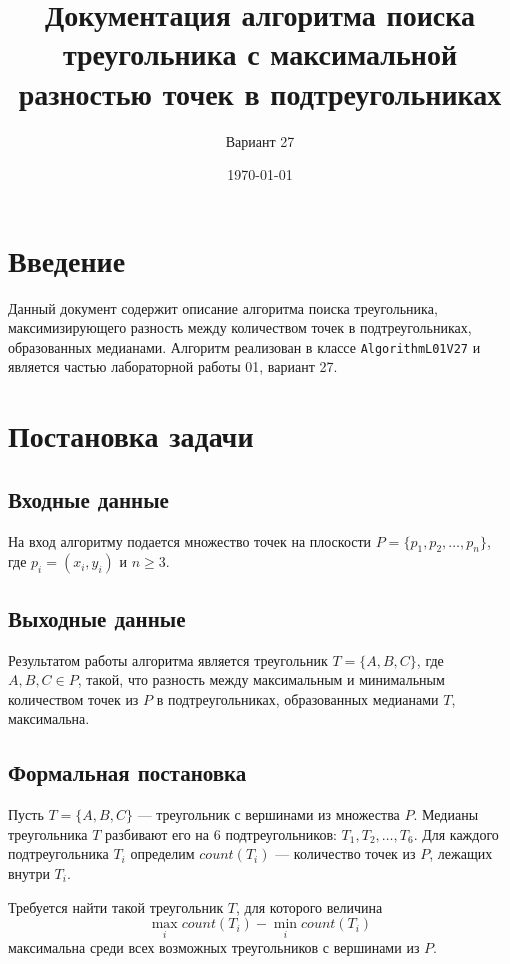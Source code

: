 \documentclass[a4paper,12pt]{article}
\title{Документация алгоритма поиска треугольника с максимальной разностью точек в подтреугольниках}
\author{Вариант 27}
\date{\today}
\begin{document}
\maketitle

\tableofcontents

\newpage

\section{Введение}

Данный документ содержит описание алгоритма поиска треугольника, максимизирующего разность между количеством точек в подтреугольниках, образованных медианами. Алгоритм реализован в классе \texttt{AlgorithmL01V27} и является частью лабораторной работы 01, вариант 27.

\section{Постановка задачи}

\subsection{Входные данные}
На вход алгоритму подается множество точек на плоскости $P = \{p_1, p_2, \ldots, p_n\}$, где $p_i = (x_i, y_i)$ и $n \geq 3$.

\subsection{Выходные данные}
Результатом работы алгоритма является треугольник $T = \{A, B, C\}$, где $A, B, C \in P$, такой, что разность между максимальным и минимальным количеством точек из $P$ в подтреугольниках, образованных медианами $T$, максимальна.

\subsection{Формальная постановка}
Пусть $T = \{A, B, C\}$ — треугольник с вершинами из множества $P$. Медианы треугольника $T$ разбивают его на 6 подтреугольников: $T_1, T_2, \ldots, T_6$. Для каждого подтреугольника $T_i$ определим $count(T_i)$ — количество точек из $P$, лежащих внутри $T_i$.

Требуется найти такой треугольник $T$, для которого величина
\begin{equation}
\max_{i} count(T_i) - \min_{i} count(T_i)
\end{equation}
максимальна среди всех возможных треугольников с вершинами из $P$.
\end{document}
